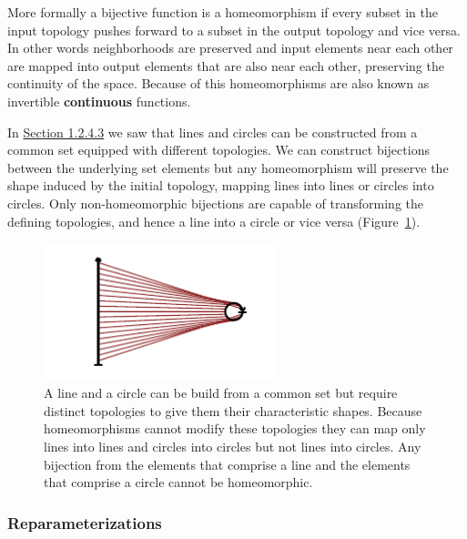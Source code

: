 \documentclass[
  letterpaper,
  DIV=11,
  numbers=noendperiod]{scrartcl}
\begin{document}
More formally a bijective function is a homeomorphism if every subset in
the input topology pushes forward to a subset in the output topology and
vice versa. In other words neighborhoods are preserved and input
elements near each other are mapped into output elements that are also
near each other, preserving the continuity of the space. Because of this
homeomorphisms are also known as invertible \textbf{continuous}
functions.

In \href{@sec:general-topology}{Section 1.2.4.3} we saw that lines and
circles can be constructed from a common set equipped with different
topologies. We can construct bijections between the underlying set
elements but any homeomorphism will preserve the shape induced by the
initial topology, mapping lines into lines or circles into circles. Only
non-homeomorphic bijections are capable of transforming the defining
topologies, and hence a line into a circle or vice versa
(Figure~\ref{fig-non-homeomorphism}).

\begin{figure}

{\centering \includegraphics[width=0.6\textwidth,height=\textheight]{figures/maps/non_homeomorphism/non_homeomorphism.pdf}

}

\caption{\label{fig-non-homeomorphism}A line and a circle can be build
from a common set but require distinct topologies to give them their
characteristic shapes. Because homeomorphisms cannot modify these
topologies they can map only lines into lines and circles into circles
but not lines into circles. Any bijection from the elements that
comprise a line and the elements that comprise a circle cannot be
homeomorphic.}

\end{figure}

\hypertarget{reparameterizations}{%
\subsubsection{Reparameterizations}\label{reparameterizations}}
\end{document}
